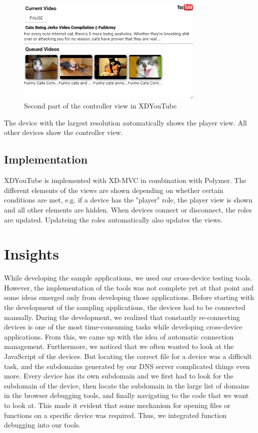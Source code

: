 \begin{figure}[H]
  \centering
    \includegraphics[width=0.8\textwidth]{images/screenshots/xdyt/controller_landscape.png}
	\caption{Second part of the controller view in XDYouTube}
	\label{fig:xdyt_controller_landscape}
\end{figure}

The device with the largest resolution automatically shows the player view. All other devices show the controller view. 

\subsection{Implementation}

XDYouTube is implemented with XD-MVC in combination with Polymer. The different elements of the views are shown depending on whether certain conditions are met, e.g. if a device has the "player" role, the player view is shown and all other elements are hidden. When devices connect or disconnect, the roles are updated. Updateing the roles automatically also updates the views.

\section{Insights}

While developing the sample applications, we used our cross-device testing tools. However, the implementation of the tools was not complete yet at that point and some ideas emerged only from developing those applications. Before starting with the development of the sampling applications, the devices had to be connected manually. During the development, we realized that constantly re-connecting devices is one of the most time-consuming tasks while developing cross-device applications. From this, we came up with the idea of automatic connection management. Furthermore, we noticed that we often wanted to look at the JavaScript of the devices. But locating the correct file for a device was a difficult task, and the subdomains generated by our DNS server complicated things even more. Every device has its own subdomain and we first had to look for the subdomain of the device, then locate the subdomain in the large list of domains in the browser debugging tools, and finally navigating to the code that we want to look at. This made it evident that some mechanism for opening files or functions on a specific device was required. Thus, we integrated function debugging into our tools. 

